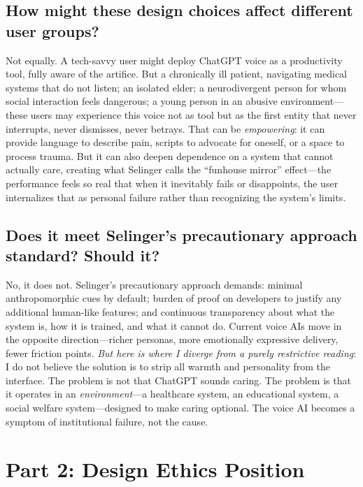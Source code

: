 \documentclass[12pt,twoside]{article}
\begin{document}
\subsection*{How might these design choices affect different user groups?}

Not equally. A tech-savvy user might deploy ChatGPT voice as a productivity tool, fully aware of the artifice. But a chronically ill patient, navigating medical systems that do not listen; an isolated elder; a neurodivergent person for whom social interaction feels dangerous; a young person in an abusive environment—these users may experience this voice not as tool but as the first entity that never interrupts, never dismisses, never betrays. That can be \emph{empowering}: it can provide language to describe pain, scripts to advocate for oneself, or a space to process trauma. But it can also deepen dependence on a system that cannot actually care, creating what Selinger calls the \enquote{funhouse mirror} effect—the performance feels so real that when it inevitably fails or disappoints, the user internalizes that as personal failure rather than recognizing the system's limits.

\subsection*{Does it meet Selinger's precautionary approach standard? Should it?}

No, it does not. Selinger's precautionary approach demands: minimal anthropomorphic cues by default; burden of proof on developers to justify any additional human-like features; and continuous transparency about what the system is, how it is trained, and what it cannot do. Current voice AIs move in the opposite direction—richer personas, more emotionally expressive delivery, fewer friction points. \emph{But here is where I diverge from a purely restrictive reading}: I do not believe the solution is to strip all warmth and personality from the interface. The problem is not that ChatGPT sounds caring. The problem is that it operates in an \emph{environment}—a healthcare system, an educational system, a social welfare system—designed to make caring optional. The voice AI becomes a symptom of institutional failure, not the cause.

\section*{Part 2: Design Ethics Position}
\end{document}
